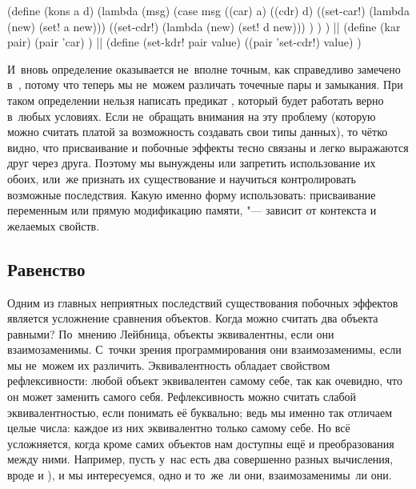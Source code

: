 \begin{code:lisp}
(define (kons a d)
  (lambda (msg)
    (case msg
      ((car) a)
      ((cdr) d)
      ((set-car!) (lambda (new) (set! a new)))
      ((set-cdr!) (lambda (new) (set! d new))) ) ) )
||
(define (kar pair)
  (pair 'car) )
||
(define (set-kdr! pair value)
  ((pair 'set-cdr!) value) )
\end{code:lisp}


И~вновь определение оказывается не~вполне точным, как справедливо замечено
в~\cite{fel90}, потому что теперь мы не~можем различать точечные пары и
замыкания. При таком определении нельзя написать предикат , который
будет работать верно в~любых условиях. Если не~обращать внимания на эту проблему
(которую можно считать платой за возможность создавать свои типы данных), то
чётко видно, что присваивание и побочные эффекты тесно связаны и легко
выражаются друг через друга. Поэтому мы вынуждены или запретить использование
их обоих, или~же признать их существование и научиться контролировать возможные
последствия. Какую именно форму использовать: присваивание переменным или прямую
модификацию памяти, "--- зависит от контекста и желаемых свойств.


\subsection{Равенство}\label{assignment/side-effects/ssect:equality}

Одним из главных неприятных последствий существования побочных эффектов является
усложнение сравнения объектов. Когда можно считать два объекта равными?
По~мнению Лейбница, объекты эквивалентны, если они взаимозаменимы. С~точки
зрения программирования они взаимозаменимы, если мы не~можем их различить.
Эквивалентность обладает свойством рефлексивности: любой объект эквивалентен
самому себе, так как очевидно, что он может заменить самого себя. Рефлексивность
можно считать слабой эквивалентностью, если понимать её буквально; ведь мы
именно так отличаем целые числа: каждое из них эквивалентно только самому себе.
Но всё усложняется, когда кроме самих объектов нам доступны ещё и преобразования
между ними. Например, пусть у~нас есть два совершенно разных вычисления, вроде
 и ), и мы интересуемся, одно и то~же~ли они,
взаимозаменимы~ли они.

